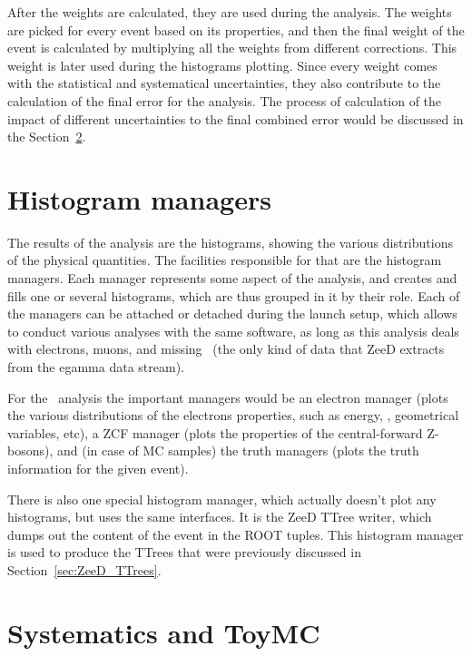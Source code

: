 After the weights are calculated, they are used during the analysis. The weights are picked for every event based on its properties, and then the final weight of the event is calculated by multiplying all the weights from different corrections. This weight is later used during the histograms plotting. Since every weight comes with the statistical and systematical uncertainties, they also contribute to the calculation of the final error for the analysis. The process of calculation of the impact of different uncertainties to the final combined error would be discussed in the Section~\ref{sec:ZeeD_toymc}.

\section{Histogram managers}

The results of the analysis are the histograms, showing the various distributions of the physical quantities. The facilities responsible for that are the histogram managers. Each manager represents some aspect of the analysis, and creates and fills one or several histograms, which are thus grouped in it by their role. Each of the managers can be attached or detached during the launch setup, which allows to conduct various analyses with the same software, as long as this analysis deals with electrons, muons, and missing \et\ (the only kind of data that ZeeD extracts from the egamma data stream).

For the \Zee\ analysis the important managers would be an electron manager (plots the various distributions of the electrons properties, such as energy, \et, geometrical variables, etc), a ZCF manager (plots the properties of the central-forward Z-bosons), and (in case of MC samples) the truth managers (plots the truth information for the given event).

There is also one special histogram manager, which actually doesn't plot any histograms, but uses the same interfaces. It is the ZeeD TTree writer, which dumps out the content of the event in the ROOT tuples. This histogram manager is used to produce the TTrees that were previously discussed in Section~\ref{sec:ZeeD_TTrees}.

\section{Systematics and ToyMC}
\label{sec:ZeeD_toymc}

